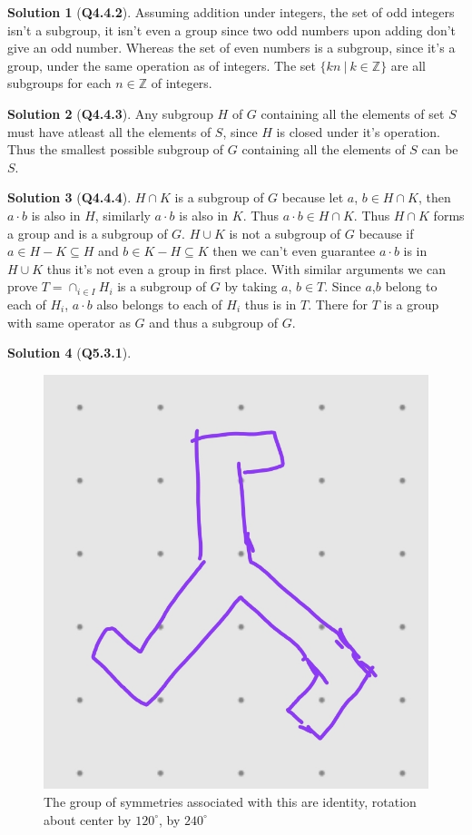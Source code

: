 \documentclass{article}
\theoremstyle{definition}
\newtheorem*{sol}{Solution}
\begin{document}
\begin{sol}[\textbf{Q4.4.2}]
	Assuming addition under integers, the set of odd integers isn't a subgroup, it isn't even a group since two odd numbers upon adding don't give an odd number. Whereas the set of even numbers is a subgroup, since it's a group, under the same operation as of integers. The set $\{kn\ |\ k \in \mathbb{Z}\}$ are all subgroups for each $n\in \mathbb{Z}$ of integers.
\end{sol}

\begin{sol}[\textbf{Q4.4.3}]
	Any subgroup $H$ of $G$ containing all the elements of set $S$ must have atleast all the elements of $S$, since $H$ is closed under it's operation. Thus the smallest possible subgroup of $G$ containing all the elements of $S$ can be $S$.
\end{sol}

\begin{sol}[\textbf{Q4.4.4}]
	$H\cap K$ is a subgroup of $G$ because let $a$, $b\in H\cap K$, then $a\cdot b$ is also in $H$, similarly $a\cdot b$ is also in $K$. Thus $a\cdot b \in H\cap K$. Thus $H\cap K$ forms a group and is a subgroup of $G$. $H\cup K$ is not a subgroup of $G$ because if $a\in H-K \subseteq H$ and $b\in K-H \subseteq K$ then we can't even guarantee $a\cdot b$ is in $H\cup K$ thus it's not even a group in first place. With similar arguments we can prove $T = \cap_{i\in I} H_i$ is a subgroup of $G$ by taking $a$, $b\in T$. Since $a$,$b$ belong to each of $H_i$, $a\cdot b$ also belongs to each of $H_i$ thus is in $T$. There for $T$ is a group with same operator as $G$ and thus a subgroup of $G$.
\end{sol}

\begin{sol}[\textbf{Q5.3.1}]
\end{sol}
\begin{figure}[H]
	\centering
	\includegraphics[width=0.3\linewidth]{5.3.1.jpg}
	\caption{The group of symmetries associated with this are identity, rotation about center by $120^\circ$, by $240^\circ$}
	\label{fig:enter-label}
\end{figure}
\end{document}
